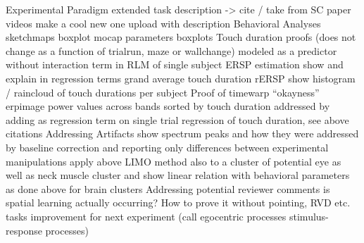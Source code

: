 Experimental Paradigm
extended task description -> cite / take from SC paper
videos
make a cool new one
upload with description
Behavioral Analyses
sketchmaps boxplot
mocap parameters boxplots
Touch duration proofs
(does not change as a function of trialrun, maze or wallchange)
modeled as a predictor without interaction term in RLM of single subject ERSP estimation
show and explain in regression terms grand average touch duration rERSP
show histogram / raincloud of touch durations per subject
Proof of timewarp “okayness”
erpimage power values across bands sorted by touch duration
addressed by adding as regression term on single trial regression of touch duration, see above
citations
Addressing Artifacts
show spectrum peaks and how they were addressed by baseline correction and reporting only differences between experimental manipulations
apply above LIMO method also to a cluster of potential eye as well as neck muscle cluster and show linear relation with behavioral parameters as done above for brain clusters
Addressing potential reviewer comments
is spatial learning actually occurring? How to prove it without pointing, RVD etc. tasks
improvement for next experiment
(call egocentric processes stimulus-response processes)

